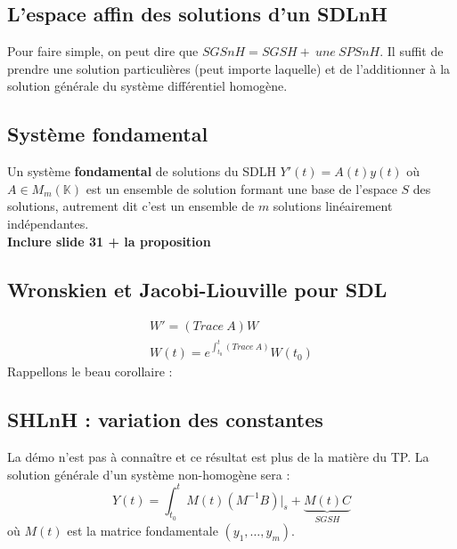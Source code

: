 \documentclass[11pt, a4paper, openany]{book}
\begin{document}
		
\subsection{L'espace affin des solutions d'un SDLnH}
Pour faire simple, on peut dire que $SGSnH = SGSH +\ une\ SPSnH$. Il suffit de prendre une solution particulières (peut importe laquelle) et de l'additionner à la solution générale du système différentiel homogène.
		
\subsection{Système fondamental}
Un système \textbf{fondamental} de solutions du SDLH $Y'(t) = A(t)y(t)$ où $A \in M_m(\mathbb{K})$ est un ensemble de solution formant une base de l'espace $S$ des solutions, autrement dit c'est un ensemble de $m$ solutions linéairement indépendantes.\\
\textbf{Inclure slide 31  + la proposition}
		
\subsection{Wronskien et Jacobi-Liouville pour SDL}
\begin{eqnarray}
	W' = (Trace\ A)W\\
	W(t) = e^{\int_{t_0}^t (Trace\ A)}W(t_0)
\end{eqnarray}
Rappellons le beau corollaire :\\
		
\subsection{SHLnH : variation des constantes}
La démo n'est pas à connaître et ce résultat est plus de la matière du TP. La solution générale d'un système non-homogène sera :
\begin{equation}
	Y(t) = \int_{t_0}^t M(t)(M^{-1}B)|_s + \underbrace{M(t)C}_{SGSH}
\end{equation}
où $M(t)$ est la matrice fondamentale $(y_1,\dots,y_m)$.
		
\end{document}
